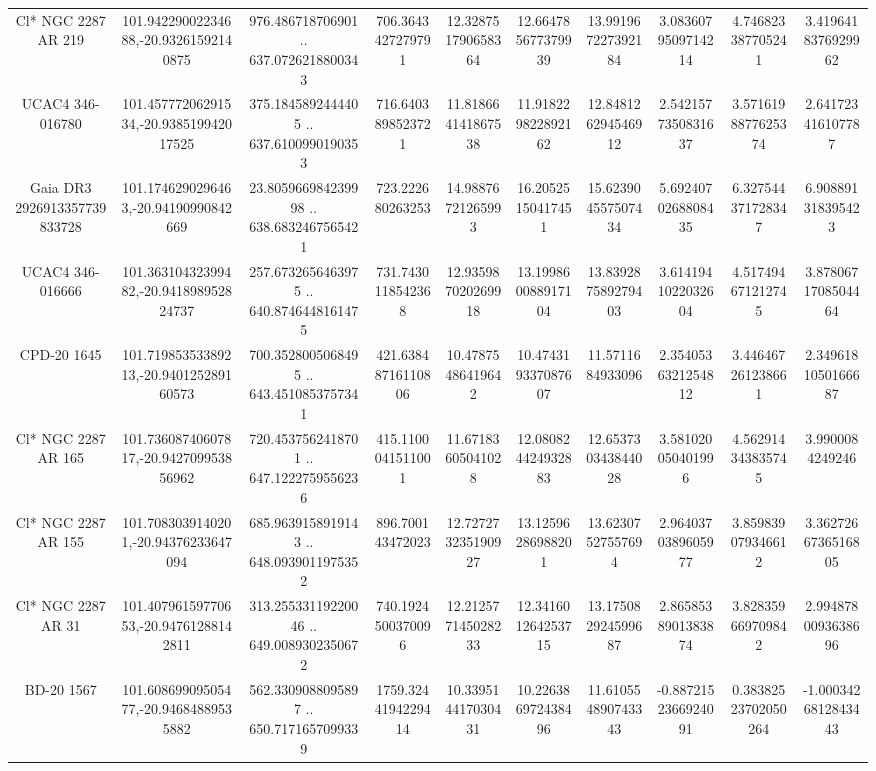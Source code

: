 \begin{table}
\begin{tabular}{cccccccccc}
Cl* NGC 2287     AR     219 & 101.94229002234688,-20.93261592140875 & 976.486718706901 .. 637.0726218800343 & 706.3643427279791 & 12.328751790658364 & 12.664785677379939 & 13.991967227392184 & 3.0836079509714214 & 4.746823387705241 & 3.4196418376929962 \\
UCAC4 346-016780 & 101.45777206291534,-20.938519942017525 & 375.1845892444405 .. 637.6100990190353 & 716.6403898523721 & 11.818664141867538 & 11.918229822892162 & 12.848126294546912 & 2.5421577350831637 & 3.5716198877625374 & 2.641723416107787 \\
Gaia DR3 2926913357739833728 & 101.1746290296463,-20.94190990842669 & 23.805966984239998 .. 638.6832467565421 & 723.222680263253 & 14.98876721265993 & 16.20525150417451 & 15.623904557507434 & 5.6924070268808435 & 6.327544371728347 & 6.908891318395423 \\
UCAC4 346-016666 & 101.36310432399482,-20.941898952824737 & 257.6732656463975 .. 640.8746448161475 & 731.7430118542368 & 12.935987020269918 & 13.199860088917104 & 13.839287589279403 & 3.6141941022032604 & 4.517494671212745 & 3.8780671708504464 \\
CPD-20  1645 & 101.71985353389213,-20.940125289160573 & 700.3528005068495 .. 643.4510853757341 & 421.63848716110806 & 10.47875486419642 & 10.474319337087607 & 11.5711684933096 & 2.3540536321254812 & 3.446467261238661 & 2.3496181050166687 \\
Cl* NGC 2287     AR     165 & 101.73608740607817,-20.942709953856962 & 720.4537562418701 .. 647.1222759556236 & 415.1100041511001 & 11.67183605041028 & 12.080824424932883 & 12.653730343844028 & 3.581020050401996 & 4.562914343835745 & 3.9900084249246 \\
Cl* NGC 2287     AR     155 & 101.7083039140201,-20.94376233647094 & 685.9639158919143 .. 648.0939011975352 & 896.700143472023 & 12.727273235190927 & 13.12596286988201 & 13.62307527557694 & 2.9640370389605977 & 3.859839079346612 & 3.3627266736516805 \\
Cl* NGC 2287     AR      31 & 101.40796159770653,-20.94761288142811 & 313.25533119220046 .. 649.0089302350672 & 740.1924500370096 & 12.212577145028233 & 12.341601264253715 & 13.175082924599687 & 2.8658538901383874 & 3.828359669709842 & 2.9948780093638696 \\
BD-20  1567 & 101.60869909505477,-20.94684889535882 & 562.3309088095897 .. 650.7171657099339 & 1759.3244194229414 & 10.339514417030431 & 10.226386972438496 & 11.610554890743343 & -0.8872152366924091 & 0.38382523702050264 & -1.0003426812843443 \\

\end{tabular}
\end{table}

